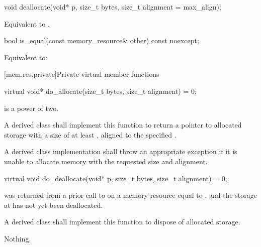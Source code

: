 \begin{indexed}{}
\begin{itemdecl}
void deallocate(void* p, size_t bytes, size_t alignment = max_align);
\end{itemdecl}
\end{indexed}

\begin{itemdescr}
\pnum
\effects
Equivalent to .
\end{itemdescr}

\begin{indexed}{}
\begin{itemdecl}
bool is_equal(const memory_resource& other) const noexcept;
\end{itemdecl}
\end{indexed}

\begin{itemdescr}
\pnum
\effects
Equivalent to: 
\end{itemdescr}


[mem.res.private]{Private virtual member functions}

%
\begin{itemdecl}
virtual void* do_allocate(size_t bytes, size_t alignment) = 0;
\end{itemdecl}

\begin{itemdescr}
\pnum
\expects
{} is a power of two.

\pnum
\returns
A derived class shall implement this function to
return a pointer to allocated storage
with a size of at least ,
aligned to the specified .

\pnum
\throws
A derived class implementation shall throw an appropriate exception if it is unable to allocate memory with the requested size and alignment.
\end{itemdescr}

%
\begin{itemdecl}
virtual void do_deallocate(void* p, size_t bytes, size_t alignment) = 0;
\end{itemdecl}

\begin{itemdescr}
\pnum
\expects
{} was returned from a prior call to 
on a memory resource equal to ,
and the storage at  has not yet been deallocated.

\pnum
\effects
A derived class shall implement this function to dispose of allocated storage.

\pnum
\throws
Nothing.
\end{itemdescr}

